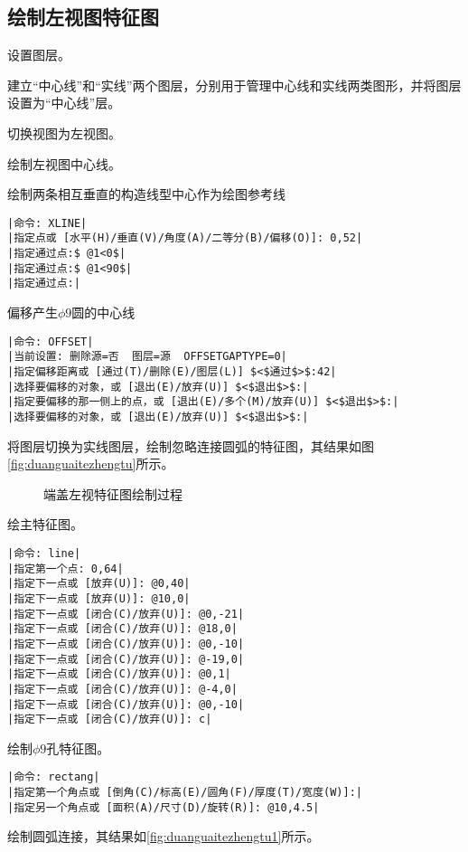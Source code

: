 
\subsection{绘制左视图特征图}
\begin{procedure}
\item 设置图层。

建立“中心线”和“实线”两个图层，分别用于管理中心线和实线两类图形，并将图层设置为“中心线”层。
\item 切换视图为左视图。

\item 绘制左视图中心线。

绘制两条相互垂直的构造线型中心作为绘图参考线
\begin{lstlisting}
|命令: XLINE|
|指定点或 [水平(H)/垂直(V)/角度(A)/二等分(B)/偏移(O)]: 0,52|
|指定通过点:$ @1<0$|
|指定通过点:$ @1<90$|
|指定通过点:|
\end{lstlisting}
偏移产生$\phi 9$圆的中心线
\begin{lstlisting}
|命令: OFFSET|
|当前设置: 删除源=否  图层=源  OFFSETGAPTYPE=0|
|指定偏移距离或 [通过(T)/删除(E)/图层(L)] $<$通过$>$:42|
|选择要偏移的对象，或 [退出(E)/放弃(U)] $<$退出$>$:|
|指定要偏移的那一侧上的点，或 [退出(E)/多个(M)/放弃(U)] $<$退出$>$:|
|选择要偏移的对象，或 [退出(E)/放弃(U)] $<$退出$>$:|
\end{lstlisting}
\item 将图层切换为实线图层，绘制忽略连接圆弧的特征图，其结果如图\ref{fig:duanguaitezhengtu}所示。
\begin{figure}[htbp]
\centering
{}\hspace{30pt}
\caption{端盖左视特征图绘制过程}
\end{figure}
绘主特征图。
\begin{lstlisting}
|命令: line|
|指定第一个点: 0,64|
|指定下一点或 [放弃(U)]: @0,40|
|指定下一点或 [放弃(U)]: @10,0|
|指定下一点或 [闭合(C)/放弃(U)]: @0,-21|
|指定下一点或 [闭合(C)/放弃(U)]: @18,0|
|指定下一点或 [闭合(C)/放弃(U)]: @0,-10|
|指定下一点或 [闭合(C)/放弃(U)]: @-19,0|
|指定下一点或 [闭合(C)/放弃(U)]: @0,1|
|指定下一点或 [闭合(C)/放弃(U)]: @-4,0|
|指定下一点或 [闭合(C)/放弃(U)]: @0,-10|
|指定下一点或 [闭合(C)/放弃(U)]: c|
\end{lstlisting}
绘制$\phi 9$孔特征图。
\begin{lstlisting}
|命令: rectang|
|指定第一个角点或 [倒角(C)/标高(E)/圆角(F)/厚度(T)/宽度(W)]:|
|指定另一个角点或 [面积(A)/尺寸(D)/旋转(R)]: @10,4.5|
\end{lstlisting}
\item 绘制圆弧连接，其结果如\ref{fig:duanguaitezhengtu1}所示。


\end{procedure}
